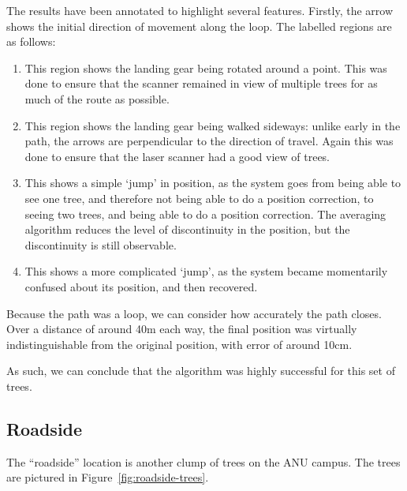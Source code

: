 \documentclass[12pt,oneside,a4paper,draft]{book}
\begin{document}
The results have been annotated to highlight several
features. Firstly, the arrow shows the initial direction of movement
along the loop. The labelled regions are as follows:
\begin{enumerate}[A:]
\item This region shows the landing gear being rotated around a
  point. This was done to ensure that the scanner remained in view of
  multiple trees for as much of the route as possible.
\item This region shows the landing gear being walked sideways: unlike
  early in the path, the arrows are perpendicular to the direction of
  travel. Again this was done to ensure that the laser scanner had a
  good view of trees.
\item This shows a simple `jump' in position, as the system goes from
  being able to see one tree, and therefore not being able to do a
  position correction, to seeing two trees, and being able to do a
  position correction. The averaging algorithm reduces the level of
  discontinuity in the position, but the discontinuity is still
  observable.
\item This shows a more complicated `jump', as the system became
  momentarily confused about its position, and then recovered.
\end{enumerate}

Because the path was a loop, we can consider how accurately the path
closes. Over a distance of around 40m each way, the final position was
virtually indistinguishable from the original position, with error of
around 10cm.

As such, we can conclude that the algorithm was highly successful for
this set of trees.

\subsection{Roadside}
\label{sec:roadside}

The ``roadside'' location is another clump of trees on the ANU
campus. The trees are pictured in Figure~\ref{fig:roadside-trees}.
\end{document}
